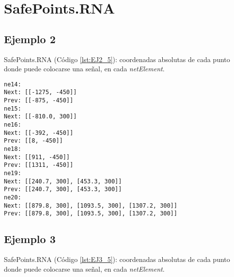 \chapter{SafePoints.RNA}
	\label{sec:safePointsRNA}
	
		
	\section{Ejemplo 2}
	SafePoints.RNA (Código \ref{lst:EJ2_5}): coordenadas absolutas de cada punto donde puede colocarse una señal, en cada \textit{netElement}.
	
	\begin{lstlisting}[language = {}, caption = SafePoints.RNA, label = {lst:EJ2_5}]
ne14:
Next: [[-1275, -450]]
Prev: [[-875, -450]]
ne15:
Next: [[-810.0, 300]]
ne16:
Next: [[-392, -450]]
Prev: [[8, -450]]
ne18:
Next: [[911, -450]]
Prev: [[1311, -450]]
ne19:
Next: [[240.7, 300], [453.3, 300]]
Prev: [[240.7, 300], [453.3, 300]]
ne20:
Next: [[879.8, 300], [1093.5, 300], [1307.2, 300]]
Prev: [[879.8, 300], [1093.5, 300], [1307.2, 300]]
	\end{lstlisting}	
	\section{Ejemplo 3}
SafePoints.RNA (Código \ref{lst:EJ3_5}): coordenadas absolutas de cada punto donde puede colocarse una señal, en cada \textit{netElement}.

